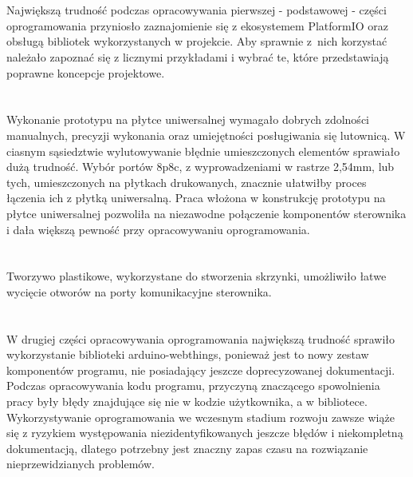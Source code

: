 \documentclass[11pt]{report}
\begin{document}
\section{}
Największą trudność podczas opracowywania pierwszej - podstawowej - części oprogramowania przyniosło zaznajomienie się z ekosystemem PlatformIO oraz obsługą bibliotek wykorzystanych w projekcie. Aby sprawnie z~nich korzystać należało zapoznać się z licznymi przykładami i wybrać te, które przedstawiają poprawne koncepcje projektowe.

\section{}
Wykonanie prototypu na płytce uniwersalnej wymagało dobrych zdolności manualnych, precyzji wykonania oraz umiejętności posługiwania się lutownicą. W ciasnym sąsiedztwie wylutowywanie błędnie umieszczonych elementów sprawiało dużą trudność.
Wybór portów 8p8c, z wyprowadzeniami w rastrze 2,54mm, lub tych, umieszczonych na płytkach drukowanych, znacznie ułatwiłby proces łączenia ich z płytką uniwersalną.
Praca włożona w konstrukcję prototypu na płytce uniwersalnej pozwoliła na niezawodne połączenie komponentów sterownika i dała większą pewność przy opracowywaniu oprogramowania.

\section{}
Tworzywo plastikowe, wykorzystane do stworzenia skrzynki, umożliwiło łatwe wycięcie otworów na porty komunikacyjne sterownika.

\section{}
W drugiej części opracowywania oprogramowania największą trudność sprawiło wykorzystanie biblioteki arduino-webthings, ponieważ jest to nowy zestaw komponentów programu, nie posiadający jeszcze doprecyzowanej dokumentacji. Podczas opracowywania kodu programu, przyczyną znaczącego spowolnienia pracy były błędy znajdujące się nie w kodzie użytkownika, a w bibliotece.
Wykorzystywanie oprogramowania we wczesnym stadium rozwoju zawsze wiąże się z ryzykiem występowania niezidentyfikowanych jeszcze błędów i niekompletną dokumentacją, dlatego potrzebny jest znaczny zapas czasu na rozwiązanie nieprzewidzianych problemów.
\end{document}
